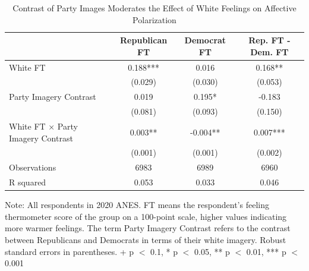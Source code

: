 \documentclass[
  12pt,
]{article}
\begin{document}
\hypertarget{tbl-mechanism}{}
\begin{table}
\caption{\label{tbl-mechanism}Contrast of Party Images Moderates the Effect of White Feelings on
Affective Polarization }\tabularnewline

\centering
\begin{threeparttable}
\begin{tabular}[t]{lccc}
\toprule
  & Republican FT & Democrat FT & Rep. FT - Dem. FT\\
\midrule
White FT & 0.188*** & 0.016 & 0.168**\\
 & (0.029) & (0.030) & (0.053)\\
Party Imagery Contrast & 0.019 & 0.195* & -0.183\\
 & (0.081) & (0.093) & (0.150)\\
White FT × Party Imagery Contrast & 0.003** & -0.004** & 0.007***\\
 & (0.001) & (0.001) & (0.002)\\
\midrule
Observations & 6983 & 6989 & 6960\\
R squared & 0.053 & 0.033 & 0.046\\
\bottomrule
\end{tabular}
\begin{tablenotes}
\item Note: All respondents in 2020 ANES. FT means the respondent's feeling thermometer score of the group on a 100-point scale, higher values indicating more warmer feelings. The term Party Imagery Contrast refers to the contrast between Republicans and Democrats in terms of their white imagery. Robust standard errors in parentheses. + p $<$ 0.1, * p $<$ 0.05, ** p $<$ 0.01, *** p $<$ 0.001
\end{tablenotes}
\end{threeparttable}
\end{table}
\end{document}
